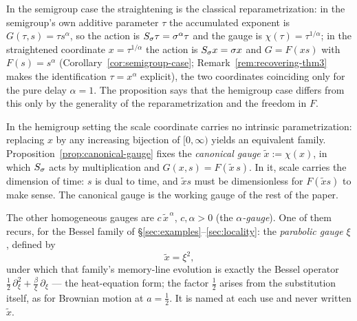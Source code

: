 In the semigroup case the straightening is the classical reparametrization: in the
semigroup's own additive parameter $\tau$ the accumulated exponent is
$G(\tau, s) = \tau s^{\alpha}$, so the action is $S_\sigma \tau = \sigma^{\alpha}\tau$
and the gauge is $\chi(\tau) = \tau^{1/\alpha}$; in the straightened coordinate
$x = \tau^{1/\alpha}$ the action is $S_\sigma x = \sigma x$ and $G = F(xs)$ with
$F(s) = s^{\alpha}$ (Corollary~\ref{cor:semigroup-case};
Remark~\ref{rem:recovering-thm3} makes the identification $\tau = x^{\alpha}$ explicit),
the two coordinates coinciding only for the pure delay $\alpha = 1$. The proposition says
that the hemigroup case differs from this only by the generality of the reparametrization
and the freedom in $F$.

\begin{remark}\label{rem:gauge-freedom}
In the hemigroup setting the scale coordinate carries no intrinsic parametrization: replacing
$x$ by any increasing bijection of $[0,\infty)$ yields an equivalent family.
Proposition~\ref{prop:canonical-gauge} fixes the \emph{canonical gauge} $\tilde x := \chi(x)$,
in which $S_\sigma$ acts by multiplication and $G(x,s) = F(\tilde x\, s)$. In it, scale
carries the dimension of time: $s$ is dual to time, and $\tilde x s$ must be dimensionless for
$F(\tilde x s)$ to make sense. The canonical gauge is the working gauge of the rest of the
paper.

The other homogeneous gauges are $c\,\tilde x^{\,\alpha}$, $c, \alpha > 0$ (the
\emph{$\alpha$-gauge}). One of them
recurs, for the Bessel family of \S\ref{sec:examples}--\ref{sec:locality}: the
\emph{parabolic gauge} $\xi$, defined by
\[
  \tilde x = \xi^2 ,
\]
under which that family's memory-line evolution is exactly the Bessel operator
$\tfrac12\,\partial_\xi^2 + \tfrac{\beta}{\xi}\,\partial_\xi$ --- the heat-equation form; the
factor $\tfrac12$ arises from the substitution itself, as for Brownian motion at $a = \tfrac12$.
It is named at each use and never written $\tilde x$.
\end{remark}
